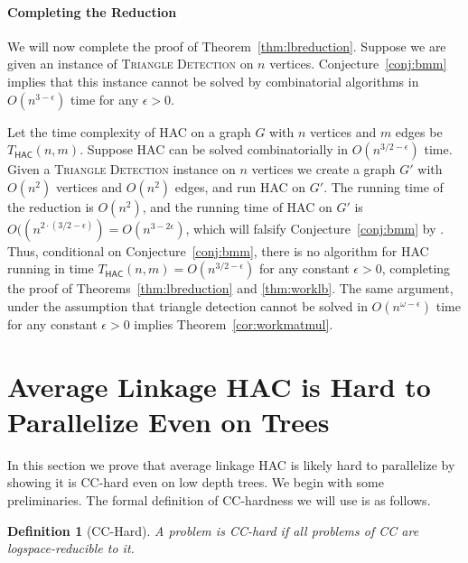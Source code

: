 \documentclass[11pt]{article}
\newcommand{\CC}{\textsc{CC}\xspace}
\newtheorem{definition}{Definition}
\begin{document}
\paragraph{Completing the Reduction}
We will now complete the proof of Theorem~\ref{thm:lbreduction}.
Suppose we are given an instance of \textsc{Triangle Detection} on $n$ vertices.
Conjecture~\ref{conj:bmm} implies that this instance cannot be solved by combinatorial algorithms in $O(n^{3-\epsilon})$ time for any $\epsilon > 0$.

Let the time complexity of HAC on a graph $G$ with $n$ vertices and $m$ edges be $T_{\mathsf{HAC}}(n,m)$.
Suppose HAC can be solved combinatorially in $O(n^{3/2 - \epsilon})$ time.
Given a \textsc{Triangle Detection} instance on $n$ vertices we create a graph $G'$ with $O(n^2)$ vertices and $O(n^2)$ edges, and run HAC on $G'$.
The running time of the reduction is $O(n^2)$, and the running time of HAC on $G'$ is $O((n^{2\cdot (3/2-\epsilon)}) = O(n^{3 - 2\epsilon})$, which will falsify Conjecture~\ref{conj:bmm} by .
Thus, conditional on Conjecture~\ref{conj:bmm}, there is no algorithm for HAC running in time $T_{\mathsf{HAC}}(n, m) = O(n^{3/2 - \epsilon})$ for any constant $\epsilon > 0$, completing the proof of Theorems~\ref{thm:lbreduction} and \ref{thm:worklb}. 
The same argument, under the assumption that triangle detection cannot be solved in $O(n^{\omega - \epsilon})$ time for any constant $\epsilon > 0$ implies Theorem~\ref{cor:workmatmul}.






\section{Average Linkage HAC is Hard to Parallelize Even on Trees}
In this section we prove that average linkage HAC is likely hard to parallelize by showing it is \CC-hard even on low depth trees.
%
%
We begin with some preliminaries. The formal definition of \CC-hardness we will use is as follows.
\begin{definition}[\CC-Hard]\label{dfn:CCComplete}
    A problem is \CC-hard if all problems of \CC are logspace-reducible to it.
\end{definition}
\end{document}
